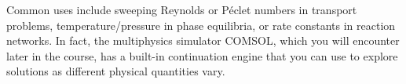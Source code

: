 Common uses include sweeping Reynolds or P\'eclet numbers in transport problems, temperature/pressure in phase equilibria, or rate constants in reaction networks. In fact, the multiphysics simulator COMSOL, which you will encounter later in the course, has a built-in continuation engine that you can use to explore solutions as different physical quantities vary.

